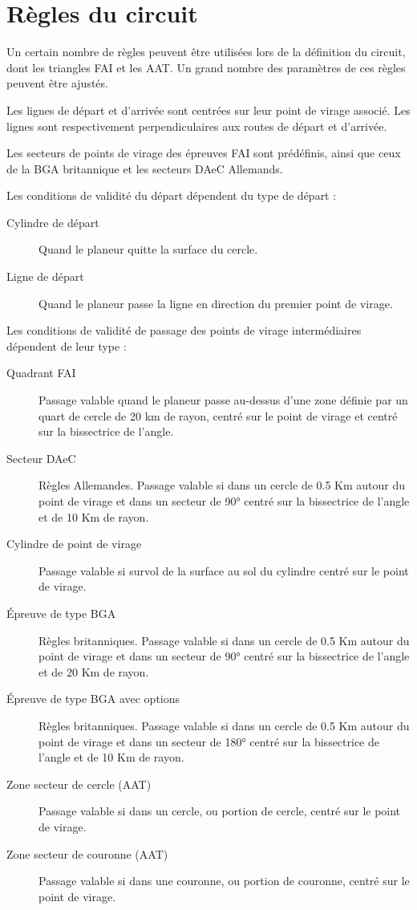 \section{Règles du circuit}\label{sec:task-rules}

Un certain nombre de règles peuvent être utilisées lors de la définition du circuit, dont les triangles FAI et les AAT. Un grand nombre des paramètres de ces règles peuvent être ajustés.

Les lignes de départ et d'arrivée sont centrées sur leur point de virage associé. Les lignes sont respectivement perpendiculaires aux routes de départ et d'arrivée.

Les secteurs de points de virage des épreuves FAI sont prédéfinis, ainsi que ceux de la BGA britannique et les secteurs DAeC Allemands.

Les conditions de validité du départ dépendent du type de départ :
\begin{description}
\item[Cylindre de départ] Quand le planeur quitte la surface du cercle.
\item[Ligne de départ] Quand le planeur passe la ligne en direction du premier point de virage.
\end{description}

Les conditions de validité de passage des points de virage intermédiaires dépendent de leur type :
\begin{description}
\item[Quadrant FAI] Passage valable quand le planeur passe au-dessus d'une zone définie par un quart de cercle de 20 km de rayon, centré sur le point de virage et centré sur la bissectrice de l'angle.
\item[Secteur DAeC] Règles Allemandes. Passage valable si dans un cercle de 0.5 Km autour du point de virage et dans un secteur de 90° centré sur la bissectrice de l'angle et de 10 Km de rayon.
\item[Cylindre de point de virage]  Passage valable si survol de la surface au sol du cylindre centré sur le point de virage.
\item[Épreuve de type BGA]  Règles britanniques. Passage valable si dans un cercle de 0.5 Km autour du point de virage et dans un secteur de 90° centré sur la bissectrice de l'angle et de 20 Km de rayon.
\item[Épreuve de type BGA avec options] Règles britanniques. Passage valable si dans un cercle de 0.5 Km autour du point de virage et dans un secteur de 180° centré sur la bissectrice de l'angle et de 10 Km de rayon.
\item[Zone secteur de cercle (AAT)]  Passage valable si dans un cercle, ou portion de cercle, centré sur le point de virage.
\item[Zone secteur de couronne (AAT)]  Passage valable si dans une couronne, ou portion de couronne, centré sur le point de virage.
\end{description}

